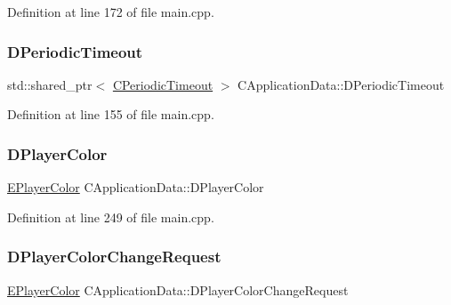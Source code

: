 Definition at line 172 of file main.\+cpp.

\hypertarget{classCApplicationData_a0265cb7aba9f099faed2a1c8ee588d33}{}\label{classCApplicationData_a0265cb7aba9f099faed2a1c8ee588d33} 
\subsubsection{\texorpdfstring{D\+Periodic\+Timeout}{DPeriodicTimeout}}
{\footnotesize\ttfamily std\+::shared\+\_\+ptr$<$ \hyperlink{classCPeriodicTimeout}{C\+Periodic\+Timeout} $>$ C\+Application\+Data\+::\+D\+Periodic\+Timeout\hspace{0.3cm}{\ttfamily [protected]}}



Definition at line 155 of file main.\+cpp.

\hypertarget{classCApplicationData_a53550939b20cba70570f113e4d1c5d02}{}\label{classCApplicationData_a53550939b20cba70570f113e4d1c5d02} 
\subsubsection{\texorpdfstring{D\+Player\+Color}{DPlayerColor}}
{\footnotesize\ttfamily \hyperlink{GameDataTypes_8h_aafb0ca75933357ff28a6d7efbdd7602f}{E\+Player\+Color} C\+Application\+Data\+::\+D\+Player\+Color\hspace{0.3cm}{\ttfamily [protected]}}



Definition at line 249 of file main.\+cpp.

\hypertarget{classCApplicationData_ae72fd0906b911705aafb9df8cf610f97}{}\label{classCApplicationData_ae72fd0906b911705aafb9df8cf610f97} 
\subsubsection{\texorpdfstring{D\+Player\+Color\+Change\+Request}{DPlayerColorChangeRequest}}
{\footnotesize\ttfamily \hyperlink{GameDataTypes_8h_aafb0ca75933357ff28a6d7efbdd7602f}{E\+Player\+Color} C\+Application\+Data\+::\+D\+Player\+Color\+Change\+Request\hspace{0.3cm}{\ttfamily [protected]}}



